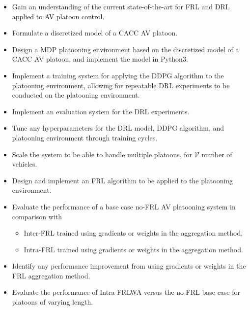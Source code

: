 \begin{itemize}
    \onehalfspacing
    \item Gain an understanding of the current state-of-the-art for FRL and DRL
    applied to AV platoon control.
    \item Formulate a discretized model of a CACC AV platoon.
    \item Design a MDP platooning environment based on the discretized model of a
    CACC AV platoon, and implement the model in Python3.
    \item Implement a training system for applying the DDPG algorithm to the platooning
    environment, allowing for repeatable DRL experiments to be conducted on the platooning environment.
    \item Implement an evaluation system for the DRL experiments.
    \item Tune any hyperparameters for the DRL model, DDPG algorithm, and platooning environment
    through training cycles.
    \item Scale the system to be able to handle multiple platoons, for $\mathcal{V}$ number of
    vehicles.
    \item Design and implement an FRL algorithm to be applied to the platooning
    environment.
    \item Evaluate the performance of a base case no-FRL AV platooning system in
    comparison with
        \begin{itemize}
            \item Inter-FRL trained using gradients or weights in the aggregation method,
            \item Intra-FRL trained using gradients or weights in the aggregation method.
        \end{itemize}
    \item Identify any performance improvement from using gradients or weights in the
    FRL aggregation method.
    \item Evaluate the performance of Intra-FRLWA versus the no-FRL base case for
    platoons of varying length.
\end{itemize}


